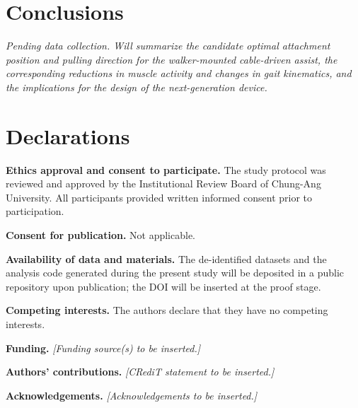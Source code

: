 \documentclass[11pt,a4paper]{article}
\begin{document}
\section{Conclusions}
\textit{Pending data collection. Will summarize the candidate optimal attachment position and pulling direction for the walker-mounted cable-driven assist, the corresponding reductions in muscle activity and changes in gait kinematics, and the implications for the design of the next-generation device.}

\section*{Declarations}

\noindent\textbf{Ethics approval and consent to participate.} The study protocol was reviewed and approved by the Institutional Review Board of Chung-Ang University. All participants provided written informed consent prior to participation.

\noindent\textbf{Consent for publication.} Not applicable.

\noindent\textbf{Availability of data and materials.} The de-identified datasets and the analysis code generated during the present study will be deposited in a public repository upon publication; the DOI will be inserted at the proof stage.

\noindent\textbf{Competing interests.} The authors declare that they have no competing interests.

\noindent\textbf{Funding.} \textit{[Funding source(s) to be inserted.]}

\noindent\textbf{Authors' contributions.} \textit{[CRediT statement to be inserted.]}

\noindent\textbf{Acknowledgements.} \textit{[Acknowledgements to be inserted.]}



\end{document}
